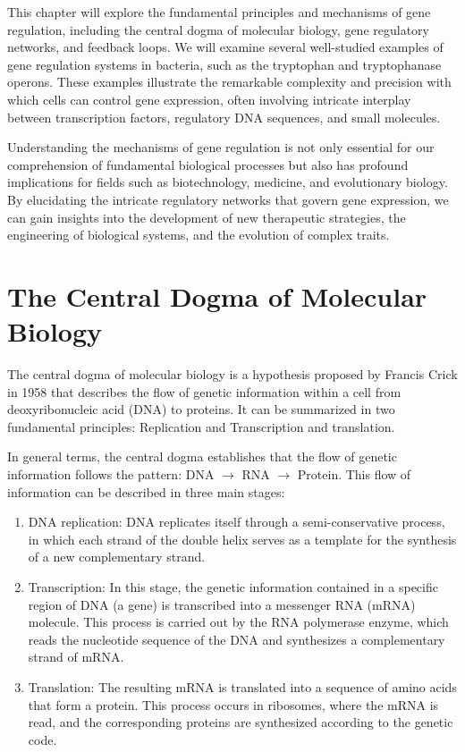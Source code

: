 This chapter will explore the fundamental principles and mechanisms of gene regulation, including the central dogma of molecular biology, gene regulatory networks, and feedback loops. We will examine several well-studied examples of gene regulation systems in bacteria, such as the tryptophan and tryptophanase operons. These examples illustrate the remarkable complexity and precision with which cells can control gene expression, often involving intricate interplay between transcription factors, regulatory DNA sequences, and small molecules.

Understanding the mechanisms of gene regulation is not only essential for our comprehension of fundamental biological processes but also has profound implications for fields such as biotechnology, medicine, and evolutionary biology. By elucidating the intricate regulatory networks that govern gene expression, we can gain insights into the development of new therapeutic strategies, the engineering of biological systems, and the evolution of complex traits.

\section{The Central Dogma of Molecular Biology}

The central dogma of molecular biology is a hypothesis proposed by Francis Crick in 1958 that describes the flow of genetic information within a cell from deoxyribonucleic acid (DNA) to proteins. It can be summarized in two fundamental principles: Replication and Transcription and translation.

In general terms, the central dogma establishes that the flow of genetic information follows the pattern: DNA $\rightarrow$ RNA $\rightarrow$ Protein. This flow of information can be described in three main stages:

\begin{enumerate}
\item DNA replication: DNA replicates itself through a semi-conservative process, in which each strand of the double helix serves as a template for the synthesis of a new complementary strand.
\item Transcription: In this stage, the genetic information contained in a specific region of DNA (a gene) is transcribed into a messenger RNA (mRNA) molecule. This process is carried out by the RNA polymerase enzyme, which reads the nucleotide sequence of the DNA and synthesizes a complementary strand of mRNA.
\item Translation: The resulting mRNA is translated into a sequence of amino acids that form a protein. This process occurs in ribosomes, where the mRNA is read, and the corresponding proteins are synthesized according to the genetic code.
\end{enumerate}

